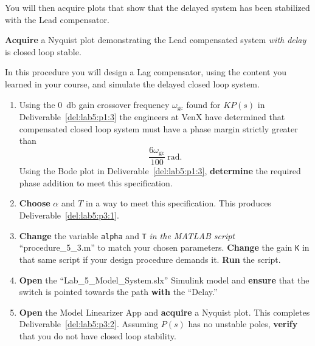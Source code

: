 %
You will then acquire plots that show that the delayed system has been stabilized with the Lead compensator.
%
\begin{deliverable}[label={del:lab5:p3:2}]
  \textbf{Acquire} a Nyquist plot demonstrating the Lead compensated system \emph{with delay} is closed loop stable.
\end{deliverable}
%
\begin{procedure}[label={proc:lab5:3}]
  In this procedure you will design a Lag compensator, using the content you learned in your course, and simulate the delayed closed loop system.
  \begin{enumerate}[label={(\arabic*)}]
    \item{%
      Using the \SI{0}{\decibel} gain crossover frequency \(\omega_\mathrm{gc}\) found for \(K P(s)\) in Deliverable~\ref{del:lab5:p1:3} the engineers at VenX have determined that compensated closed loop system must have a phase margin strictly greater than
      \[
        \frac{6\omega_\mathrm{gc}}{100}~\mathrm{rad}.
      \]
      Using the Bode plot in Deliverable~\ref{del:lab5:p1:3}, \textbf{determine} the required phase addition to meet this specification.
    }
    \item{%
      \textbf{Choose} \(\alpha\) and \(T\) in a way to meet this specification.
      This produces Deliverable~\ref{del:lab5:p3:1}.
    }
    \item{%
      \textbf{Change} the variable \texttt{alpha} and \texttt{T} \emph{in the MATLAB script} ``procedure\_5\_3.m'' to match your chosen parameters.
      \textbf{Change} the gain \texttt{K} in that same script if your design procedure demands it.
      \textbf{Run} the script.
    }
    \item{%
      \textbf{Open} the ``Lab\_5\_Model\_System.slx'' Simulink model and \textbf{ensure} that the switch is pointed towards the path \textbf{with} the ``Delay.''
    }
    \item{%
      \textbf{Open} the Model Linearizer App and \textbf{acquire} a Nyquist plot.
      This completes Deliverable~\ref{del:lab5:p3:2}.
      Assuming \(P(s)\) has no unstable poles, \textbf{verify} that you do not have closed loop stability.
    }
  \end{enumerate}
\end{procedure}

